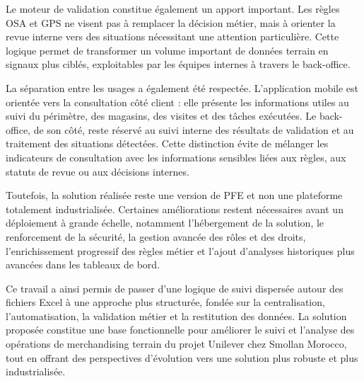 Le moteur de validation constitue également un apport important. Les règles OSA et GPS ne visent pas à remplacer la décision métier, mais à orienter la revue interne vers des situations nécessitant une attention particulière. Cette logique permet de transformer un volume important de données terrain en signaux plus ciblés, exploitables par les équipes internes à travers le back-office.

La séparation entre les usages a également été respectée. L’application mobile est orientée vers la consultation côté client : elle présente les informations utiles au suivi du périmètre, des magasins, des visites et des tâches exécutées. Le back-office, de son côté, reste réservé au suivi interne des résultats de validation et au traitement des situations détectées. Cette distinction évite de mélanger les indicateurs de consultation avec les informations sensibles liées aux règles, aux statuts de revue ou aux décisions internes.

Toutefois, la solution réalisée reste une version de PFE et non une plateforme totalement industrialisée. Certaines améliorations restent nécessaires avant un déploiement à grande échelle, notamment l’hébergement de la solution, le renforcement de la sécurité, la gestion avancée des rôles et des droits, l’enrichissement progressif des règles métier et l’ajout d’analyses historiques plus avancées dans les tableaux de bord.

Ce travail a ainsi permis de passer d’une logique de suivi dispersée autour des fichiers Excel à une approche plus structurée, fondée sur la centralisation, l’automatisation, la validation métier et la restitution des données. La solution proposée constitue une base fonctionnelle pour améliorer le suivi et l’analyse des opérations de merchandising terrain du projet Unilever chez Smollan Morocco, tout en offrant des perspectives d’évolution vers une solution plus robuste et plus industrialisée.
